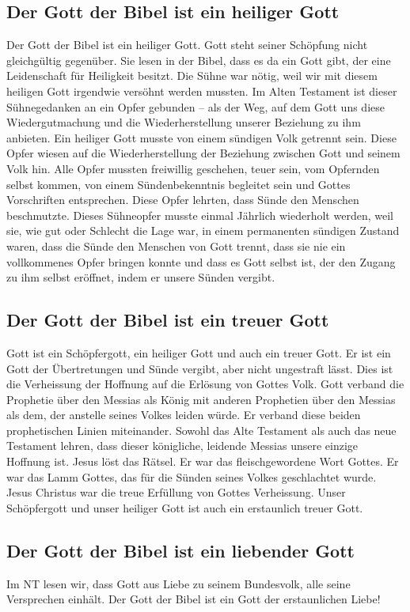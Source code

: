 \documentclass{../../inc/mybib}
\begin{document}
\subsection{Der Gott der Bibel ist ein heiliger Gott}
Der Gott der Bibel ist ein heiliger Gott. Gott steht seiner Schöpfung nicht gleichgültig gegenüber. Sie lesen in der Bibel, dass es da ein Gott gibt, der eine Leidenschaft für Heiligkeit besitzt.
Die Sühne war nötig, weil wir mit diesem heiligen Gott irgendwie versöhnt werden mussten. Im Alten Testament ist dieser Sühnegedanken an ein Opfer gebunden -- als der Weg, auf dem Gott uns diese Wiedergutmachung und die Wiederherstellung unserer Beziehung zu ihm anbieten. Ein heiliger Gott musste von einem sündigen Volk getrennt sein. Diese Opfer wiesen auf die Wiederherstellung der Beziehung zwischen Gott und seinem Volk hin. Alle Opfer mussten freiwillig geschehen, teuer sein, vom Opfernden selbst kommen, von einem Sündenbekenntnis begleitet sein und Gottes Vorschriften entsprechen. Diese Opfer lehrten, dass Sünde den Menschen beschmutzte. Dieses Sühneopfer musste einmal Jährlich wiederholt werden, weil sie, wie gut oder Schlecht die Lage war, in einem permanenten sündigen Zustand waren, dass die Sünde den Menschen von Gott trennt, dass sie nie ein vollkommenes Opfer bringen konnte und dass es Gott selbst ist, der den Zugang zu ihm selbst eröffnet, indem er unsere Sünden vergibt.
\subsection{Der Gott der Bibel ist ein treuer Gott}
Gott ist ein Schöpfergott, ein heiliger Gott und auch ein treuer Gott. Er ist ein Gott der Übertretungen und Sünde vergibt, aber nicht ungestraft lässt. Dies ist die Verheissung der Hoffnung auf die Erlösung von Gottes Volk. Gott verband die Prophetie über den Messias als König mit anderen Prophetien über den Messias als dem, der anstelle seines Volkes leiden würde. Er verband diese beiden prophetischen Linien miteinander. Sowohl das Alte Testament als auch das neue Testament lehren, dass dieser königliche, leidende Messias unsere einzige Hoffnung ist. Jesus löst das Rätsel. Er war das fleischgewordene Wort Gottes. Er war das Lamm Gottes, das für die Sünden seines Volkes geschlachtet wurde. Jesus Christus war die treue Erfüllung von Gottes Verheissung. Unser Schöpfergott und unser heiliger Gott ist auch ein erstaunlich treuer Gott.
\subsection{Der Gott der Bibel ist ein liebender Gott}
Im NT lesen wir, dass Gott aus Liebe zu seinem Bundesvolk, alle seine Versprechen einhält. Der Gott der Bibel ist ein Gott der erstaunlichen Liebe!
\end{document}

